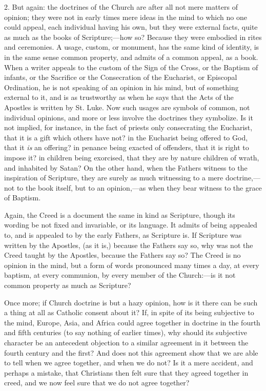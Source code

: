 2. But again: the doctrines of the Church are after all not mere
matters of opinion; they were not in early times mere ideas in the
mind to which no one could appeal, each individual having his own, but
they were external facts, quite as much as the books of Scripture;—how
so? Because they were embodied in rites and ceremonies. A usage,
custom, or monument, has the same kind of identity, is in the same
sense common property, and admits of a common appeal, as a book. When
a writer appeals to the custom of the Sign of the Cross, or the
Baptism of infants, or the Sacrifice or the Consecration of the
Eucharist, or Episcopal Ordination, he is not speaking of an opinion
in his mind, but of something external to it, and is as trustworthy as
when he says that the Acts of the Apostles is written by St. Luke. Now
such usages are symbols of common, not individual opinions, and
more or less involve the doctrines they symbolize. Is it not implied,
for instance, in the fact of priests only consecrating the Eucharist,
that it is a gift which others have not? in the Eucharist being
offered to God, that it \emph{is} an offering? in penance being
exacted of offenders, that it is right to impose it? in children being
exorcised, that they are by nature children of wrath, and inhabited by
Satan? On the other hand, when the Fathers witness to the inspiration
of Scripture, they are surely as much witnessing to a mere doctrine,—not
to the book itself, but to an opinion,—as when they bear witness to
the grace of Baptism.

Again, the Creed is a document the same in kind as Scripture,
though its wording be not fixed and invariable, or its language. It
admits of being appealed to, and is appealed to by the early Fathers,
as Scripture is. If Scripture was written by the Apostles, (as it is,)
because the Fathers say so, why was not the Creed taught by the
Apostles, because the Fathers say so? The Creed is no opinion in the
mind, but a form of words pronounced many times a day, at every
baptism, at every communion, by every member of the Church:—is it
not common property as much as Scripture?

Once more; if Church doctrine is but a hazy opinion, how is it
there can be such a thing at all as Catholic consent about it? If, in
spite of its being subjective to the mind, Europe, Asia, and Africa
could agree together in doctrine in the fourth and fifth centuries (to
say nothing of earlier times), why should its subjective character be
an antecedent objection to a similar agreement in it between the
fourth century and the first? And does not this agreement show that we
are able to tell when we agree together, and when we do not? Is it a
mere accident, and perhaps a mistake, that Christians then felt
sure that they agreed together in creed, and we now feel sure that we
do not agree together?

